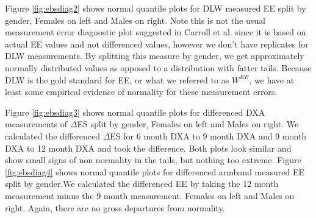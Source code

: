 \documentclass[11pt]{article}\usepackage[]{graphicx}\usepackage[]{color}
\begin{document}
Figure \ref{fig:ebsdiag2} shows normal quantile plots for DLW measured EE split by gender, Females on left and Males on right. Note this is not the usual measurement error diagnostic plot suggested in Carroll et al. \cite{nonlinear} since it is based on actual EE values and not differenced values, however we don't have replicates for DLW measurements. By splitting this measure by gender, we get approximately normally distributed values as opposed to a distribution with fatter tails. Because DLW is the gold standard for EE, or what we referred to as $W^{EE}$, we have at least some empirical evidence of normality for these measurement errors. 

Figure \ref{fig:ebsdiag3} shows normal quantile plots for differenced DXA measurements of $\Delta$ES split by gender, Females on left and Males on right. We calculated the differenced $\Delta$ES for 6 month DXA to 9 month DXA and 9 month DXA to 12 month DXA and took the difference. Both plots look similar and show small signs of non normality in the tails, but nothing too extreme. Figure \ref{fig:ebsdiag4} shows normal quantile plots for differenced armband measured EE split by gender.We calculated the differenced EE by taking the 12 month measurement minus the 9 month measurement. Females on left and Males on right. Again, there are no gross departures from normality. 
\end{document}
